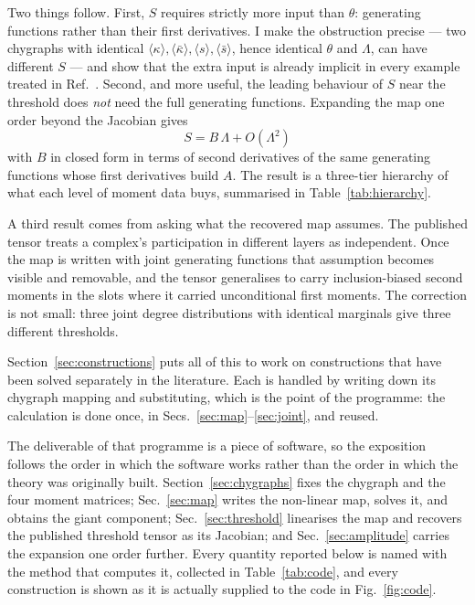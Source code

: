 \documentclass[aps,pre,twocolumn,superscriptaddress,floatfix,longbibliography]{revtex4-2}
\newcommand{\ave}[1]{\langle #1 \rangle}
\begin{document}
Two things follow. First, $S$ requires strictly more input than $\theta$:
generating functions rather than their first derivatives. I make the obstruction
precise --- two chygraphs with identical $\ave{\kappa},\ave{\bar\kappa},
\ave{s},\ave{\bar s}$, hence identical $\theta$ and $\Lambda$, can have
different $S$ --- and show that the extra input is already implicit in every
example treated in Ref.~\cite{vazquez2024comnet}. Second, and more useful, the
leading behaviour of $S$ near the threshold does \emph{not} need the full
generating functions. Expanding the map one order beyond the Jacobian gives
\begin{equation}
  S = B\,\Lambda + O(\Lambda^2)
\end{equation}
with $B$ in closed form in terms of second derivatives of the same generating
functions whose first derivatives build $A$. The result is a three-tier
hierarchy of what each level of moment data buys, summarised in
Table~\ref{tab:hierarchy}.

A third result comes from asking what the recovered map assumes. The published
tensor treats a complex's participation in different layers as independent.
Once the map is written with joint generating functions that assumption becomes
visible and removable, and the tensor generalises to carry inclusion-biased
second moments in the slots where it carried unconditional first moments. The
correction is not small: three joint degree distributions with identical
marginals give three different thresholds.

Section~\ref{sec:constructions} puts all of this to work on constructions that
have been solved separately in the literature. Each is handled by writing down
its chygraph mapping and substituting, which is the point of the programme: the
calculation is done once, in Secs.~\ref{sec:map}--\ref{sec:joint}, and reused.

The deliverable of that programme is a piece of software, so the exposition
follows the order in which the software works rather than the order in which the
theory was originally built. Section~\ref{sec:chygraphs} fixes the chygraph and
the four moment matrices; Sec.~\ref{sec:map} writes the non-linear map, solves
it, and obtains the giant component; Sec.~\ref{sec:threshold} linearises the map
and recovers the published threshold tensor as its Jacobian; and
Sec.~\ref{sec:amplitude} carries the expansion one order further. Every quantity
reported below is named with the method that computes it, collected in
Table~\ref{tab:code}, and every construction is shown as it is actually supplied
to the code in Fig.~\ref{fig:code}.
\end{document}
